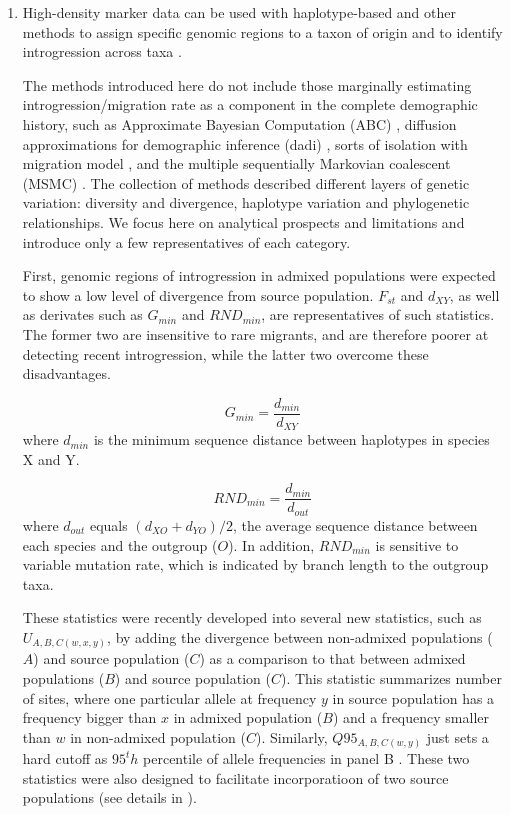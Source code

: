 \documentclass[11pt]{article}
\begin{document}
\begin{enumerate}

\item{High-density marker data can be used with haplotype-based and other methods to assign specific genomic regions to a taxon of origin and to identify introgression across taxa \cite{Martin2015,Price2009,Lawson2012,pease2015,rosenzweig2016,geneva2015}.}

The methods introduced here do not include those marginally estimating introgression\slash migration rate as a component in the complete demographic history, such as Approximate Bayesian Computation (ABC) \cite{beaumont2002}, diffusion approximations for demographic inference (dadi) \cite {gutenkunst2009}, sorts of isolation with migration model \cite{hey2004}, and the multiple sequentially Markovian coalescent (MSMC) \cite{schiffels2014}. 
The collection of methods described different layers of genetic variation: diversity and divergence, haplotype variation and phylogenetic relationships.
We focus here on analytical prospects and limitations and introduce only a few representatives of each category.

First, genomic regions of introgression in admixed populations were expected to show a low level of divergence from source population.
$F_{st}$ and $d_{XY}$, as well as derivates such as $G_{min}$ \cite{geneva2015} and $RND_{min}$\cite{rosenzweig2016}, are representatives of such statistics. 
The former two are insensitive to rare migrants, and are therefore poorer at detecting recent introgression, while the latter two overcome these disadvantages.
 
 \begin{equation}
    G_{min} = \frac{d_{min}}{d_{XY}}
 \end{equation}
 where $d_{min}$ is the minimum sequence distance between haplotypes in species X and Y.
 
 \begin{equation}
 	RND_{min} = \frac{d_{min}}{d_{out}}
 \end{equation}
where $d_{out}$ equals $(d_{XO} + d_{YO})/2$, the average sequence distance between each species and the outgroup ($O$).
In addition, $RND_{min}$ is sensitive to variable mutation rate, which is indicated by branch length to the outgroup taxa. 
 
These statistics were recently developed into several new statistics, such as $U_{A,B,C(w,x,y)}$, by adding the divergence between non-admixed populations ($A$) and source population ($C$) as a comparison to that between admixed populations ($B$) and source population ($C$)\cite{racimo2016}. 
This statistic summarizes number of sites, where one particular allele at frequency $y$ in source population has a frequency bigger than $x$ in admixed population ($B$) and a frequency smaller than $w$ in non-admixed population ($C$).
Similarly, $Q95_{A,B,C(w,y)}$ just sets a hard cutoff as $95^th$ percentile of allele frequencies in panel B \cite{racimo2016}. 
These two statistics were also designed to facilitate incorporatioon of two source populations (see details in \cite{racimo2016}).
 

\end{enumerate}
\end{document}
